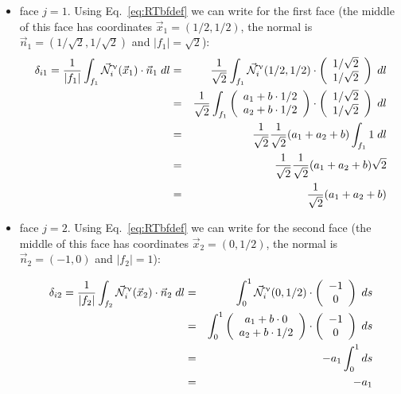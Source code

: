 \begin{itemize}
\item face $j=1$. 
Using Eq.~\eqref{eq:RTbfdef} we can write for the first face (the middle of this face has coordinates 
$\vec{x}_1=(1/2,1/2)$, the normal is $\vec{n}_1=(1/\sqrt2,1/\sqrt2)$ and $|f_1|=\sqrt 2$):
\begin{eqnarray}
\delta_{i1}=
\frac{1}{|f_1|} \int_{f_1} \vec{{\mathcal{N}}}^\upnu_i( \vec{x}_1) \cdot \vec{n}_1 \; dl
&=& \frac{1}{\sqrt 2} \int_{f_1} \vec{{\mathcal{N}}}^\upnu_i( 1/2,1/2) \cdot 
\left(\begin{array}{c} 1/\sqrt2 \\1/\sqrt2 \end{array}\right) \; dl \nonumber\\
&=& \frac{1}{\sqrt 2} \int_{f_1} 
\left(\begin{array}{c} a_1+b\cdot 1/2 \\ a_2 + b \cdot 1/2 \end{array}\right)
\cdot 
\left(\begin{array}{c} 1/\sqrt2 \\1/\sqrt2 \end{array}\right) \; dl \nonumber\\
&=& \frac{1}{\sqrt 2} \frac{1}{\sqrt2} (a_1 + a_2+b) \int_{f_1} 1 \; dl \nonumber\\
&=& \frac{1}{\sqrt 2} \frac{1}{\sqrt2} (a_1 + a_2+b) \sqrt 2 \nonumber\\
&=& \frac{1}{\sqrt 2}  (a_1 + a_2+b) \label{eq:RT0tri1}
\end{eqnarray}


\item face $j=2$.
Using Eq.~\eqref{eq:RTbfdef} we can write for the second face (the middle of this face has coordinates $\vec{x}_2=(0,1/2)$, the normal is $\vec{n}_2=(-1,0)$ and $|f_2|=1$):

\begin{eqnarray}
\delta_{i2}=
\frac{1}{|f_2|} \int_{f_2} \vec{{\mathcal{N}}}^\upnu_i( \vec{x}_2) \cdot \vec{n}_2 \; dl
&=& 
 \int_{0}^1  \vec{{\mathcal{N}}}^\upnu_i( 0,1/2) \cdot 
\left(\begin{array}{c} -1 \\0 \end{array}\right) \; ds \nonumber\\
&=&  \int_{0}^1 
\left(\begin{array}{c} a_1 + b \cdot 0 \\ a_2 + b \cdot 1/2 \end{array}\right)
\cdot 
\left(\begin{array}{c} -1 \\ 0 \end{array}\right) \; ds \nonumber\\
&=& -   a_1 \int_0^1 ds \nonumber\\
&=& -   a_1 \label{eq:RT0tri2}
\end{eqnarray}



\end{itemize}

